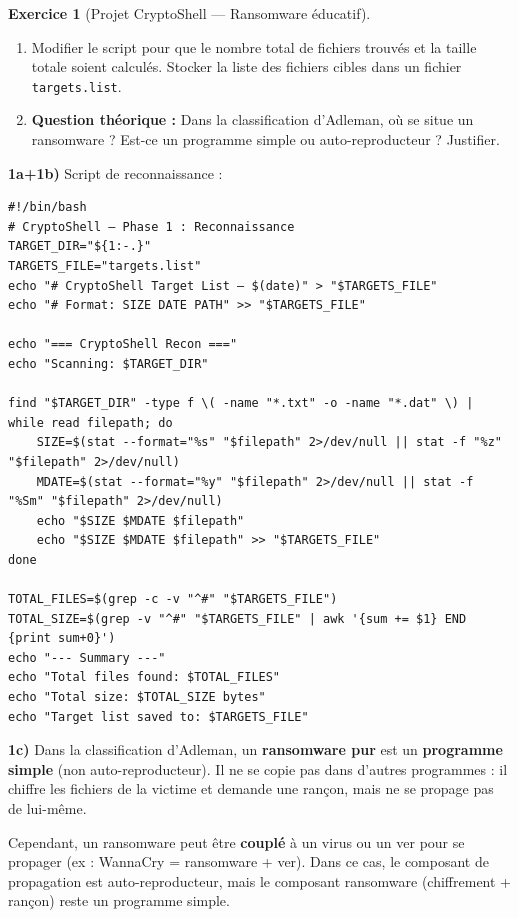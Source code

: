 \documentclass[a4paper,11pt]{article}
\theoremstyle{plain}
\theoremstyle{definition}
\newtheorem{exercice}{Exercice}
\begin{document}
\begin{exercice}[Projet CryptoShell --- Ransomware éducatif]
\begin{enumerate}
\item[\textbf{1b)}] Modifier le script pour que le nombre total de fichiers trouvés et la taille totale soient calculés. Stocker la liste des fichiers cibles dans un fichier \texttt{targets.list}.

\item[\textbf{1c)}] \textbf{Question théorique :} Dans la classification d'Adleman, où se situe un ransomware ? Est-ce un programme simple ou auto-reproducteur ? Justifier.
\end{enumerate}

\begin{correction}

\textbf{1a+1b)} Script de reconnaissance :
\begin{lstlisting}[title=recon.sh (phase1\_recon.sh)]
#!/bin/bash
# CryptoShell — Phase 1 : Reconnaissance
TARGET_DIR="${1:-.}"
TARGETS_FILE="targets.list"
echo "# CryptoShell Target List — $(date)" > "$TARGETS_FILE"
echo "# Format: SIZE DATE PATH" >> "$TARGETS_FILE"

echo "=== CryptoShell Recon ==="
echo "Scanning: $TARGET_DIR"

find "$TARGET_DIR" -type f \( -name "*.txt" -o -name "*.dat" \) | while read filepath; do
    SIZE=$(stat --format="%s" "$filepath" 2>/dev/null || stat -f "%z" "$filepath" 2>/dev/null)
    MDATE=$(stat --format="%y" "$filepath" 2>/dev/null || stat -f "%Sm" "$filepath" 2>/dev/null)
    echo "$SIZE $MDATE $filepath"
    echo "$SIZE $MDATE $filepath" >> "$TARGETS_FILE"
done

TOTAL_FILES=$(grep -c -v "^#" "$TARGETS_FILE")
TOTAL_SIZE=$(grep -v "^#" "$TARGETS_FILE" | awk '{sum += $1} END {print sum+0}')
echo "--- Summary ---"
echo "Total files found: $TOTAL_FILES"
echo "Total size: $TOTAL_SIZE bytes"
echo "Target list saved to: $TARGETS_FILE"
\end{lstlisting}

\textbf{1c)} Dans la classification d'Adleman, un \textbf{ransomware pur} est un \textbf{programme simple} (non auto-reproducteur). Il ne se copie pas dans d'autres programmes : il chiffre les fichiers de la victime et demande une rançon, mais ne se propage pas de lui-même.

Cependant, un ransomware peut être \textbf{couplé} à un virus ou un ver pour se propager (ex : WannaCry = ransomware + ver). Dans ce cas, le composant de propagation est auto-reproducteur, mais le composant ransomware (chiffrement + rançon) reste un programme simple.


\end{correction}
\end{exercice}
\end{document}
